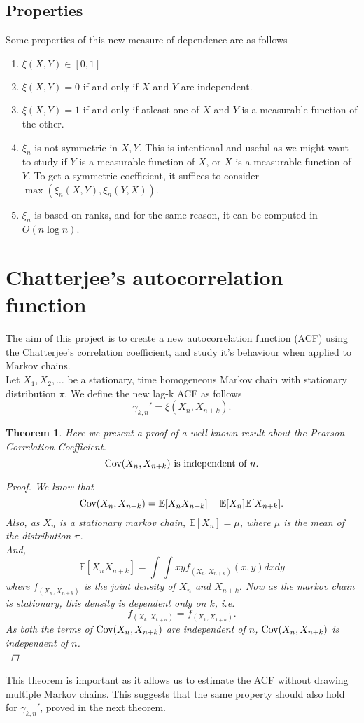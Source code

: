 \documentclass{article}
\newtheorem{theorem}{Theorem}[section]
\begin{document}
	\subsection{Properties}
	Some properties of this new measure of dependence are as follows
	\begin{enumerate}
		\item $\xi(X, Y) \in [0, 1]$
		\item $\xi(X, Y) = 0$ if and only if $X$ and $Y$ are independent.
		\item $\xi(X, Y) = 1$ if and only if atleast one of $X$ and $Y$ is a measurable function of the other.
		\item $\xi_n$ is not symmetric in $X, Y$. This is intentional and useful as we might want to study if $Y$ is a measurable function of $X$, or $X$ is a measurable function of $Y$. To get a symmetric coefficient, it suffices to consider $\max(\xi_n(X, Y), \xi_n(Y, X))$.
		\item $\xi_n$ is based on ranks, and for the same reason, it can be computed in $O(n\log n)$.
	\end{enumerate}

\section{Chatterjee's autocorrelation function}
	The aim of this project is to create a new autocorrelation function (ACF) using the Chatterjee's correlation coefficient, and study it's behaviour when applied to Markov chains.\\
	Let $X_1, X_2, \dots$ be a stationary, time homogeneous Markov chain with stationary distribution $\pi$.
	We define the new lag-k ACF as follows
	$$\gamma_{k, n}' = \xi(X_n, X_{n+k}).$$

	\begin{theorem}
		Here we present a proof of a well known result about the Pearson Correlation Coefficient.
		$$\text{Cov}(X_n, X_{n+k}) \text{ is independent of } n.$$
		\begin{proof}
			We know that
			$$\text{Cov}(X_n, X_{n+k}) = \mathbb{E}[X_n X_{n+k}] - \mathbb{E}[X_n]\mathbb{E}[X_{n+k}].$$
			Also, as $X_n$ is a stationary markov chain, $\mathbb{E}[X_n] = \mu$, where $\mu$ is the mean of the distribution $\pi$.\\
			And,
			$$\mathbb{E}[X_n X_{n+k}] = \int\int xyf_{(X_n, X_{n+k})}(x, y)dxdy$$
			where $f_{(X_n, X_{n+k})}$ is the joint density of $X_n$ and $X_{n+k}$. Now as the markov chain is stationary, this density is dependent only on $k$, i.e. $$f_{(X_k, X_{k+n})} = f_{(X_1, X_{1+n})}.$$
			As both the terms of $\text{Cov}(X_n, X_{n+k})$ are independent of $n$, $\text{Cov}(X_n, X_{n+k})$ is independent of $n$.\\
		\end{proof}
	\end{theorem}
	This theorem is important as it allows us to estimate the ACF without drawing multiple Markov chains.
	This suggests that the same property should also hold for $\gamma_{k, n}'$, proved in the next theorem.
\end{document}
